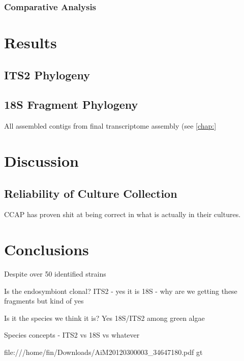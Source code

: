 \subsubsection{Comparative Analysis}


\section{Results}

\subsection{ITS2 Phylogeny}



\subsection{18S Fragment Phylogeny}

All assembled contigs from final transcriptome assembly (see \ref{chap:}

\section{Discussion}

\subsection{Reliability of Culture Collection}

CCAP has proven shit at being correct in what is actually in their cultures. 


\section{Conclusions}

Despite over 50 identified strains 


Is the endosymbiont clonal?
ITS2 - yes it is
18S - why are we getting these fragments but kind of yes

Is it the species we think it is?
Yes 18S/ITS2 among green algae

Species concepts  - ITS2 vs 18S vs whatever \citep{Boenigk2012}

file:///home/fin/Downloads/AiM20120300003_34647180.pdf
gt

